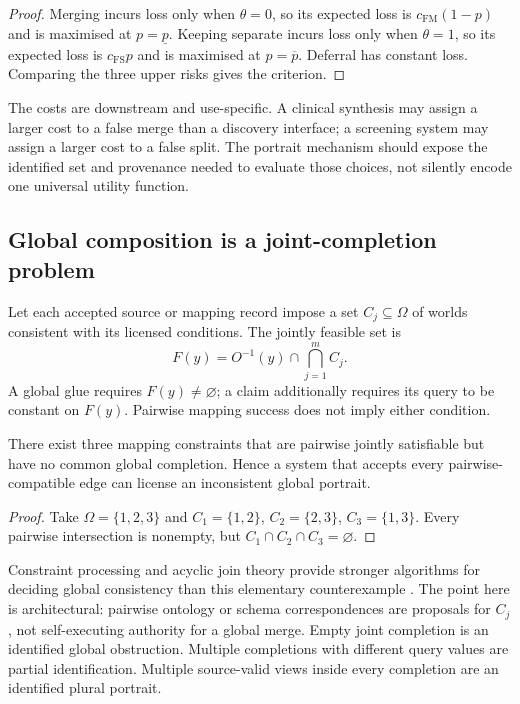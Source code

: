 \begin{proof}
Merging incurs loss only when $\theta=0$, so its expected loss is
$c_{\mathrm{FM}}(1-p)$ and is maximised at $p=\underline p$. Keeping separate
incurs loss only when $\theta=1$, so its expected loss is
$c_{\mathrm{FS}}p$ and is maximised at $p=\overline p$. Deferral has constant
loss. Comparing the three upper risks gives the criterion.
\end{proof}

The costs are downstream and use-specific. A clinical synthesis may assign a
larger cost to a false merge than a discovery interface; a screening system
may assign a larger cost to a false split. The portrait mechanism should
expose the identified set and provenance needed to evaluate those choices,
not silently encode one universal utility function.

\subsection{Global composition is a joint-completion problem}

Let each accepted source or mapping record impose a set
$C_j\subseteq\Omega$ of worlds consistent with its licensed conditions. The
jointly feasible set is
\begin{equation}
  F(y)=O^{-1}(y)\cap\bigcap_{j=1}^{m}C_j.
  \label{eq:joint-completion}
\end{equation}
A global glue requires $F(y)\neq\varnothing$; a claim additionally requires
its query to be constant on $F(y)$. Pairwise mapping success does not imply
either condition.

\begin{proposition}
\label{prop:pairwise}
There exist three mapping constraints that are pairwise jointly satisfiable
but have no common global completion. Hence a system that accepts every
pairwise-compatible edge can license an inconsistent global portrait.
\end{proposition}

\begin{proof}
Take $\Omega=\{1,2,3\}$ and
$C_1=\{1,2\}$, $C_2=\{2,3\}$, $C_3=\{1,3\}$. Every pairwise intersection is
nonempty, but $C_1\cap C_2\cap C_3=\varnothing$.
\end{proof}

Constraint processing and acyclic join theory provide stronger algorithms for
deciding global consistency than this elementary counterexample
\cite{dechter2003constraint}. The point here is architectural: pairwise
ontology or schema correspondences are proposals for $C_j$, not self-executing
authority for a global merge. Empty joint completion is an identified global
obstruction. Multiple completions with different query values are partial
identification. Multiple source-valid views inside every completion are an
identified plural portrait.

